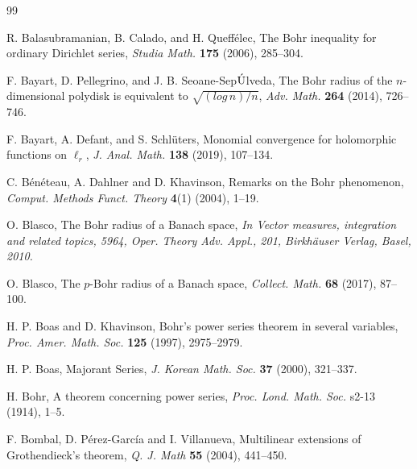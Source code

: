 \documentclass[a4paper,12pt]{amsart}
\theoremstyle{definition}
\begin{document}
\begin{thebibliography}{99}
	

	
 {\sc R. Balasubramanian, B. Calado}, and {\sc H. Queff\'{e}lec}, The Bohr inequality for ordinary Dirichlet series, {\it Studia Math.} {\bf 175} (2006), 285--304. 

	
	 {\sc F. Bayart, D. Pellegrino}, and {\sc J. B. Seoane-Sep$\rm \acute{U}$lveda}, The Bohr radius of the $n$-dimensional polydisk is equivalent to $\sqrt{(log \, n)/n}$, {\it Adv. Math.} {\bf 264} (2014), 726--746.
	
	 {\sc F. Bayart, A. Defant}, and {\sc S. Schl\"{u}ters}, Monomial convergence for holomorphic functions on $\ell_r$, {\it J. Anal. Math.} {\bf 138} (2019), 107--134.
	

	 {\sc C. B{\'e}n{\'e}teau}, {\sc A. Dahlner} and {\sc D. Khavinson}, Remarks on the Bohr phenomenon, {\it Comput. Methods Funct. Theory} \textbf{4}(1) (2004), 1--19.
	

	
	 {\sc O. Blasco}, The Bohr radius of a Banach space, {\it In Vector measures, integration and related topics, 5964, Oper. Theory Adv. Appl., 201, Birkh{\"a}user Verlag, Basel, 2010.}
	
	 {\sc O. Blasco}, The $p$-Bohr radius of a Banach space, {\it Collect. Math.} {\bf 68} (2017), 87--100.
	
	
	 {\sc H. P. Boas} and {\sc D. Khavinson}, Bohr's power series theorem in several variables, {\it Proc. Amer. Math. Soc.}  {\bf 125} (1997), 2975--2979.
	
		 {\sc H. P. Boas}, Majorant Series,  {\it J. Korean Math. Soc.}  {\bf 37} (2000), 321--337.
	
	 {\sc H. Bohr}, A theorem concerning power series,  {\it Proc. Lond. Math. Soc.} s2-13 (1914), 1--5.
	
	 {\sc F. Bombal, D. P\'{e}rez-Garc\'{i}a} and {\sc I. Villanueva}, Multilinear extensions of Grothendieck's theorem, {\it Q. J. Math} {\bf 55} (2004), 441--450.
	

\end{thebibliography}
\end{document}
